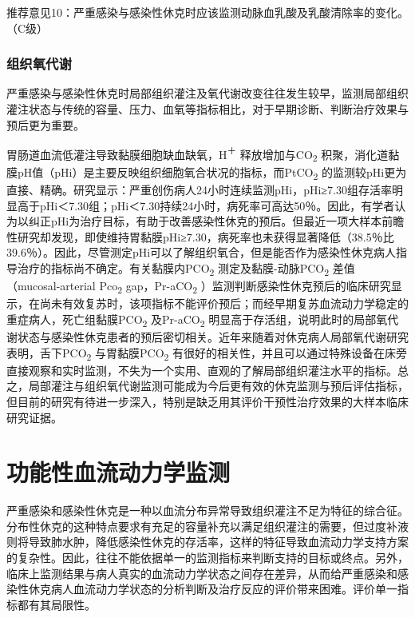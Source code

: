 推荐意见10：严重感染与感染性休克时应该监测动脉血乳酸及乳酸清除率的变化。（C级）

\subsubsection{组织氧代谢}

严重感染与感染性休克时局部组织灌注及氧代谢改变往往发生较早，监测局部组织灌注状态与传统的容量、压力、血氧等指标相比，对于早期诊断、判断治疗效果与预后更为重要。

胃肠道血流低灌注导致黏膜细胞缺血缺氧，H\textsuperscript{＋}
释放增加与CO\textsubscript{2}
积聚，消化道黏膜pH值（pHi）是主要反映组织细胞氧合状况的指标，而PtCO\textsubscript{2}
的监测较pHi更为直接、精确。研究显示：严重创伤病人24小时连续监测pHi，pHi≥7.30组存活率明显高于pHi＜7.30组；pHi＜7.30持续24小时，病死率可高达50％。因此，有学者认为以纠正pHi为治疗目标，有助于改善感染性休克的预后。但最近一项大样本前瞻性研究却发现，即使维持胃黏膜pHi≥7.30，病死率也未获得显著降低（38.5％比39.6％）。因此，尽管测定pHi可以了解组织氧合，但是能否作为感染性休克病人指导治疗的指标尚不确定。有关黏膜内PCO\textsubscript{2}
测定及黏膜-动脉PCO\textsubscript{2} 差值（mucosal-arterial
Pco\textsubscript{2} gap，Pr-aCO\textsubscript{2}
）监测判断感染性休克预后的临床研究显示，在尚未有效复苏时，该项指标不能评价预后；而经早期复苏血流动力学稳定的重症病人，死亡组黏膜PCO\textsubscript{2}
及Pr-aCO\textsubscript{2}
明显高于存活组，说明此时的局部氧代谢状态与感染性休克患者的预后密切相关。近年来随着对休克病人局部氧代谢研究表明，舌下PCO\textsubscript{2}
与胃黏膜PCO\textsubscript{2}
有很好的相关性，并且可以通过特殊设备在床旁直接观察和实时监测，不失为一个实用、直观的了解局部组织灌注水平的指标。总之，局部灌注与组织氧代谢监测可能成为今后更有效的休克监测与预后评估指标，但目前的研究有待进一步深入，特别是缺乏用其评价干预性治疗效果的大样本临床研究证据。

\section{功能性血流动力学监测}

严重感染和感染性休克是一种以血流分布异常导致组织灌注不足为特征的综合征。分布性休克的这种特点要求有充足的容量补充以满足组织灌注的需要，但过度补液则将导致肺水肿，降低感染性休克的存活率，这样的特征导致血流动力学支持方案的复杂性。因此，往往不能依据单一的监测指标来判断支持的目标或终点。另外，临床上监测结果与病人真实的血流动力学状态之间存在差异，从而给严重感染和感染性休克病人血流动力学状态的分析判断及治疗反应的评价带来困难。评价单一指标都有其局限性。

